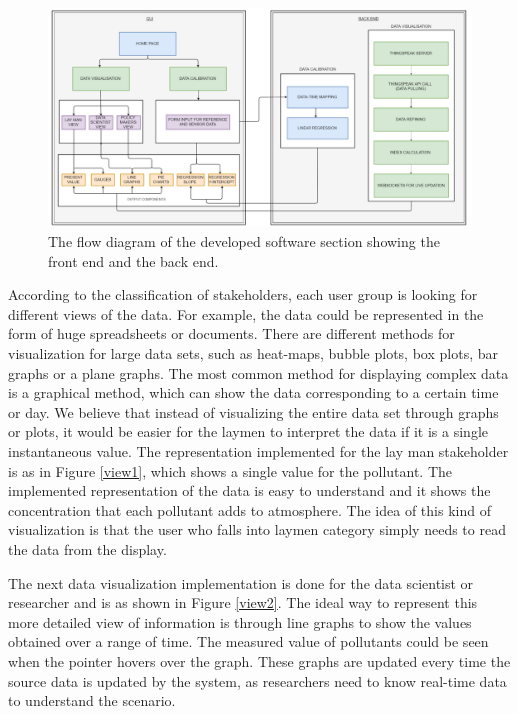\begin{figure}[h]
  \begin{center}
  \includegraphics[scale=0.58]{./images/figure33.png}
  \end{center}
  \caption{The flow diagram of the developed software section showing the front end and the back end.}
  \label{frameworksoft}
\end{figure}

\hspace{1 cm}




According to the classification of stakeholders, each user group is looking for different views of the data. For example, the data could be represented in the form of huge spreadsheets or documents. There are different methods for visualization for large data sets, such as heat-maps, bubble plots, box plots, bar graphs or a plane graphs. The most common method for displaying complex data is a graphical method, which can show the data corresponding to a certain time or day. We believe that instead of visualizing the entire data set through graphs or plots, it would be easier for the laymen to interpret the data if it is a single instantaneous value. The  representation implemented for the lay man stakeholder is as in Figure \ref{view1}, which shows a single value for the pollutant. The implemented representation of the data is easy to understand and it shows the concentration that each pollutant adds to atmosphere. The idea of this kind of visualization is that the user who falls into laymen category simply needs to read the data from the display.



The next data visualization implementation is done for the  data scientist or researcher and is as shown in Figure \ref{view2}. The ideal way to represent this more detailed view of information is through line graphs to show the values obtained over a range of time. The measured value of pollutants could be seen when the pointer hovers over the graph. These graphs are updated every time the source data is updated by the system, as researchers need to know real-time data to understand the scenario. 


